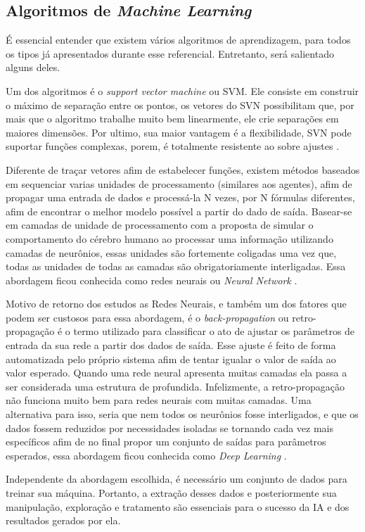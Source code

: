\subsection{Algoritmos de \textit{Machine Learning}}
É essencial entender que existem vários algoritmos de aprendizagem, para todos os tipos já apresentados durante esse referencial. Entretanto, será salientado alguns deles.

Um dos algoritmos é o \textit{support vector machine} ou SVM. Ele consiste em construir o máximo de separação entre os pontos, os vetores do SVN possibilitam que, por mais que o algoritmo trabalhe muito bem linearmente, ele crie separações em maiores dimensões. Por ultimo, sua maior vantagem é a flexibilidade, SVN pode suportar funções complexas, porem, é totalmente resistente ao sobre ajustes \cite[744]{russell2003artificial}.

Diferente de traçar vetores afim de estabelecer funções, existem métodos baseados em sequenciar varias unidades de processamento (similares aos agentes), afim de propagar uma entrada de dados e processá-la N vezes, por N fórmulas diferentes, afim de encontrar o melhor modelo possível a partir do dado de saída. Basear-se em camadas de unidade de processamento com a proposta de simular o comportamento do cérebro humano ao processar uma informação utilizando camadas de neurônios, essas unidades são fortemente coligadas uma vez que, todas as unidades de todas as camadas são obrigatoriamente interligadas. Essa abordagem ficou conhecida como redes neurais ou \textit{Neural Network} \cite{haykin2004comprehensive, russell2003artificial}.

Motivo de retorno dos estudos as Redes Neurais, e também um dos fatores que podem ser custosos para essa abordagem, é o \textit{back-propagation} ou retro-propagação é o termo utilizado para classificar o ato de ajustar os parâmetros de entrada da sua rede a partir dos dados de saída. Esse ajuste é feito de forma automatizada pelo próprio sistema afim de tentar igualar o valor de saída ao valor esperado. Quando uma rede neural apresenta muitas camadas ela passa a ser considerada uma estrutura de profundida. Infelizmente, a retro-propagação não funciona muito bem para redes neurais com muitas camadas. Uma alternativa para isso, seria que nem todos os neurônios fosse interligados, e que os dados fossem reduzidos por necessidades isoladas se tornando cada vez mais específicos afim de no final propor um conjunto de saídas para parâmetros esperados, essa abordagem ficou conhecida como \textit{Deep Learning} \cite{lecun2015deep}.

Independente da abordagem escolhida, é necessário um conjunto de dados para treinar sua máquina. Portanto, a extração desses dados e posteriormente sua manipulação, exploração e tratamento são essenciais para o sucesso da IA e dos resultados gerados por ela.
